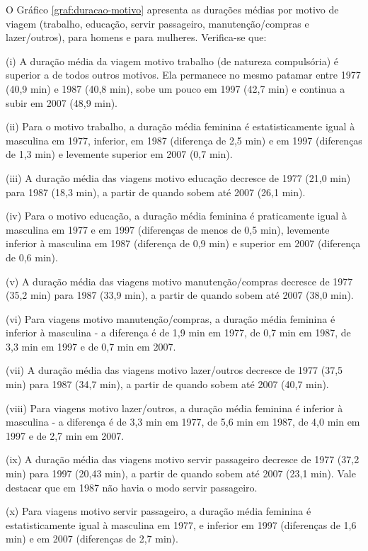 O Gráfico \ref{graf:duracao-motivo} apresenta as durações médias por motivo de viagem (trabalho, educação, servir passageiro, manutenção/compras e lazer/outros), para homens e para mulheres. Verifica-se que:
\begin{compactitem}[]
\item (i) A duração média da viagem motivo trabalho (de natureza compulsória) é superior a de todos outros motivos. Ela permanece no mesmo patamar entre 1977 (40,9 min) e 1987 (40,8 min), sobe um pouco em 1997 (42,7 min) e continua a subir em 2007 (48,9 min).
\item (ii) Para o motivo trabalho, a duração média feminina é estatisticamente igual à masculina em 1977, inferior, em 1987 (diferença de 2,5 min) e em 1997 (diferenças de 1,3 min) e levemente superior em 2007 (0,7 min).
\item (iii) A duração média das viagens motivo educação decresce de 1977 (21,0 min) para 1987 (18,3 min), a partir de quando sobem até 2007 (26,1 min).
\item (iv) Para o motivo educação, a duração média feminina é praticamente igual à masculina em 1977 e em 1997 (diferenças de menos de 0,5 min), levemente inferior à masculina em 1987 (diferença de 0,9 min) e superior em 2007 (diferença de 0,6 min).
\item (v) A duração média das viagens motivo manutenção/compras decresce de 1977 (35,2 min) para 1987 (33,9 min), a partir de quando sobem até 2007 (38,0 min).
\item (vi) Para viagens motivo manutenção/compras, a duração média feminina é inferior à masculina - a diferença é de 1,9 min em 1977, de 0,7 min em 1987, de 3,3 min em 1997 e de 0,7 min em 2007.
\item (vii) A duração média das viagens motivo lazer/outros decresce de 1977 (37,5 min) para 1987 (34,7 min), a partir de quando sobem até 2007 (40,7 min).
\item (viii) Para viagens motivo lazer/outros, a duração média feminina é inferior à masculina - a diferença é de 3,3 min em 1977, de 5,6 min em 1987, de 4,0 min em 1997 e de 2,7 min em 2007.
\item (ix) A duração média das viagens motivo servir passageiro decresce de 1977 (37,2 min) para 1997 (20,43 min), a partir de quando sobem até 2007 (23,1 min). Vale destacar que em 1987 não havia o modo servir passageiro.
\item (x) Para viagens motivo servir passageiro,  a duração média feminina é estatisticamente igual à masculina em 1977, e inferior em 1997 (diferenças de 1,6 min) e em 2007 (diferenças de 2,7 min).
\end{compactitem}


